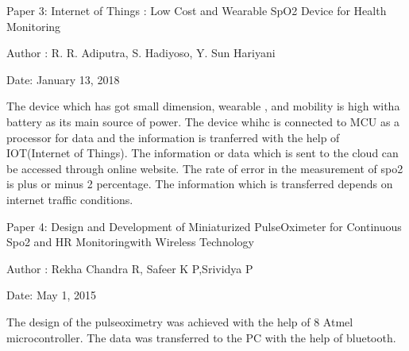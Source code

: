 Paper 3:  Internet of Things : Low Cost and Wearable SpO2 Device for Health Monitoring 

Author : R. R. Adiputra, S. Hadiyoso, Y. Sun Hariyani

Date: January 13, 2018

The device which has got small dimension, wearable , and mobility is high witha battery as its main source of power. The device whihc is connected to MCU as a processor for data and the information is tranferred with the help of IOT(Internet of Things). The information or data which is sent to the cloud can be accessed through online website. The rate of error in the measurement of spo2 is plus or minus 2 percentage. The information which is transferred depends on  internet traffic conditions. 

Paper 4: Design and Development of Miniaturized PulseOximeter for Continuous Spo2 and HR Monitoringwith Wireless Technology

Author : Rekha Chandra R, Safeer K P,Srividya P

Date: May 1, 2015
 
The design of the pulseoximetry was achieved with the help of 8 Atmel microcontroller. The data was transferred to the PC with the help of bluetooth.  